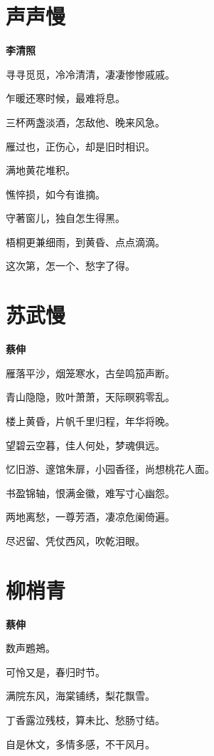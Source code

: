 \documentclass[12pt,a4paper]{ctexbook}
\begin{document}
\section{声声慢}
\textbf{李清照}\par\vspace{0.5em}
寻寻觅觅，冷冷清清，凄凄惨惨戚戚。\par
乍暖还寒时候，最难将息。\par
三杯两盏淡酒，怎敌他、晚来风急。\par
雁过也，正伤心，却是旧时相识。\par
满地黄花堆积。\par
憔悴损，如今有谁摘。\par
守著窗儿，独自怎生得黑。\par
梧桐更兼细雨，到黄昏、点点滴滴。\par
这次第，怎一个、愁字了得。\par

\section{苏武慢}
\textbf{蔡伸}\par\vspace{0.5em}
雁落平沙，烟笼寒水，古垒鸣笳声断。\par
青山隐隐，败叶萧萧，天际暝鸦零乱。\par
楼上黄昏，片帆千里归程，年华将晚。\par
望碧云空暮，佳人何处，梦魂俱远。\par
忆旧游、邃馆朱扉，小园香径，尚想桃花人面。\par
书盈锦轴，恨满金徽，难写寸心幽怨。\par
两地离愁，一尊芳酒，凄凉危阑倚遍。\par
尽迟留、凭仗西风，吹乾泪眼。\par

\section{柳梢青}
\textbf{蔡伸}\par\vspace{0.5em}
数声鶗鴂。\par
可怜又是，春归时节。\par
满院东风，海棠铺绣，梨花飘雪。\par
丁香露泣残枝，算未比、愁肠寸结。\par
自是休文，多情多感，不干风月。\par
\end{document}
